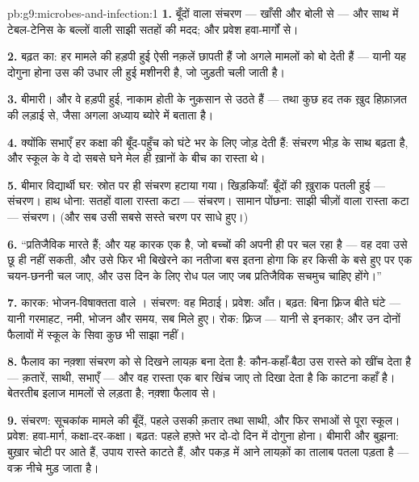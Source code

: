 \begin{solution}{pb:g9:microbes-and-infection:1}
\textbf{1.} बूँदों वाला संचरण --- खाँसी और बोली से --- और साथ में
टेबल-टेनिस के बल्लों वाली साझी सतहों की मदद; और प्रवेश हवा-मार्गों से।

\textbf{2.} बढ़त का: हर मामले की हड़पी हुई  ऐसी नक़लें छापती
हैं जो अगले मामलों को बो देती हैं --- यानी यह दोगुना होना उस  की
उधार ली हुई मशीनरी है, जो जुड़ती चली जाती है।

\textbf{3.} बीमारी। और वे हड़पी हुई, नाकाम होती  के नुक़सान
से उठते हैं --- तथा कुछ हद तक ख़ुद हिफ़ाज़त की लड़ाई से, जैसा अगला अध्याय
ब्योरे में बताता है।

\textbf{4.} क्योंकि सभाएँ हर कक्षा की बूँद-पहुँच को घंटे भर के लिए जोड़
देती हैं: संचरण भीड़ के साथ बढ़ता है, और स्कूल के वे दो सबसे घने मेल ही
ख़ानों के बीच का रास्ता थे।

\textbf{5.} बीमार विद्यार्थी घर: स्रोत पर ही संचरण हटाया गया।
खिड़कियाँ: बूँदों की ख़ुराक पतली हुई --- संचरण। हाथ धोना: सतहों वाला
रास्ता कटा --- संचरण। सामान पोंछना: साझी चीज़ों वाला रास्ता कटा ---
संचरण। (और सब उसी सबसे सस्ते चरण पर साधे हुए।)

\textbf{6.} ``प्रतिजैविक  मारते हैं; और यह कारक एक  है, जो
बच्चों की अपनी ही  पर चल रहा है --- वह दवा उसे छू ही नहीं सकती,
और उसे फिर भी बिखेरने का नतीजा बस इतना होगा कि हर किसी के बसे हुए
 पर एक चयन-छननी चल जाए, और उस दिन के लिए रोध पल जाए जब
प्रतिजैविक सचमुच चाहिए होंगे।''

\textbf{7.} कारक: भोजन-विषाक्तता वाले । संचरण: वह मिठाई। प्रवेश:
आँत। बढ़त: बिना फ़्रिज बीते घंटे --- यानी गरमाहट, नमी, भोजन और समय, सब
मिले हुए। रोक: फ़्रिज --- यानी  से इनकार; और उन दोनों फैलावों
में स्कूल के सिवा कुछ भी साझा नहीं।

\textbf{8.} फैलाव का नक़्शा संचरण को  से दिखने लायक़ बना देता है:
कौन-कहाँ-बैठा उस रास्ते को खींच देता है --- क़तारें, साथी, सभाएँ --- और
वह रास्ता एक बार खिंच जाए तो दिखा देता है कि काटना कहाँ है। बेतरतीब इलाज
मामलों से लड़ता है; नक़्शा फैलाव से।

\textbf{9.} संचरण: सूचकांक मामले की बूँदें, पहले उसकी क़तार तथा साथी,
और फिर सभाओं से पूरा स्कूल। प्रवेश: हवा-मार्ग, कक्षा-दर-कक्षा। बढ़त:
पहले हफ़्ते भर दो-दो दिन में दोगुना होना। बीमारी और बुझना: बुख़ार चोटी पर
आते हैं, उपाय रास्ते काटते हैं, और पकड़ में आने लायक़ों का तालाब पतला
पड़ता है --- वक्र नीचे मुड़ जाता है।


\end{solution}

